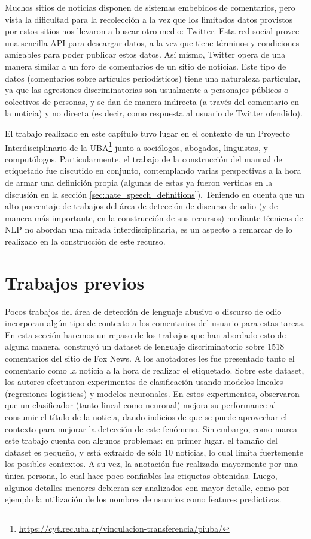 Muchos sitios de noticias disponen de sistemas embebidos de comentarios, pero vista la dificultad para la recolección a la vez que los limitados datos provistos por estos sitios nos llevaron a buscar otro medio: Twitter. Esta red social provee una sencilla API para descargar datos, a la vez que tiene términos y condiciones amigables para poder publicar estos datos. Así mismo, Twitter opera de una manera similar a un foro de comentarios de un sitio de noticias. Este tipo de datos (comentarios sobre artículos periodísticos) tiene una naturaleza particular, ya que las agresiones discriminatorias son usualmente a personajes públicos o colectivos de personas, y se dan de manera indirecta (a través del comentario en la noticia) y no directa (es decir, como respuesta al usuario de Twitter ofendido).

El trabajo realizado en este capítulo tuvo lugar en el contexto de un Proyecto Interdisciplinario de la UBA\footnote{\url{https://cyt.rec.uba.ar/vinculacion-transferencia/piuba/}} junto a sociólogos, abogados, lingüistas, y computólogos. Particularmente, el trabajo de la construcción del manual de etiquetado fue discutido en conjunto, contemplando varias perspectivas a la hora de armar una definición propia (algunas de estas ya fueron vertidas en la discusión en la sección \ref{sec:hate_speech_definitions}). Teniendo en cuenta que un alto porcentaje de trabajos del área de detección de discurso de odio (y de manera más importante, en la construcción de sus recursos) mediante técnicas de NLP no abordan una mirada interdisciplinaria, es un aspecto a remarcar de lo realizado en la construcción de este recurso.

\section{Trabajos previos}
\label{sec:dataset_previous}

Pocos trabajos del área de detección de lenguaje abusivo o discurso de odio incorporan algún tipo de contexto a los comentarios del usuario para estas tareas. En esta sección haremos un repaso de los trabajos que han abordado esto de alguna manera. \citet{gao-huang-2017-detecting} construyó un dataset de lenguaje discriminatorio sobre 1518 comentarios del sitio de Fox News. A los anotadores les fue presentado tanto el comentario como la noticia a la hora de realizar el etiquetado. Sobre este dataset, los autores efectuaron experimentos de clasificación usando modelos lineales (regresiones logísticas) y modelos neuronales. En estos experimentos, observaron que un clasificador (tanto lineal como neuronal) mejora su performance al consumir el título de la noticia, dando indicios de que se puede aprovechar el contexto para mejorar la detección de este fenómeno. Sin embargo, como marca \citet{pavlopoulos2020toxicity} este trabajo cuenta con algunos problemas: en primer lugar, el tamaño del dataset es pequeño, y está extraído de sólo 10 noticias, lo cual limita fuertemente los posibles contextos. A su vez, la anotación fue realizada mayormente por una única persona, lo cual hace poco confiables las etiquetas obtenidas. Luego, algunos detalles menores debieran ser analizados con mayor detalle, como por ejemplo la utilización de los nombres de usuarios como features predictivas.

